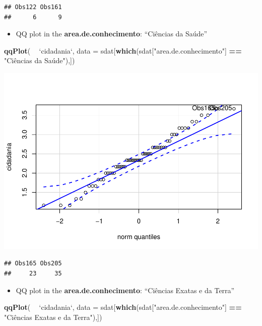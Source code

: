 \documentclass[]{article}
\newenvironment{Shaded}{\begin{snugshade}}{\end{snugshade}}
\newcommand{\DataTypeTok}[1]{\textcolor[rgb]{0.13,0.29,0.53}{#1}}
\newcommand{\KeywordTok}[1]{\textcolor[rgb]{0.13,0.29,0.53}{\textbf{#1}}}
\newcommand{\NormalTok}[1]{#1}
\newcommand{\OperatorTok}[1]{\textcolor[rgb]{0.81,0.36,0.00}{\textbf{#1}}}
\newcommand{\StringTok}[1]{\textcolor[rgb]{0.31,0.60,0.02}{#1}}
\providecommand{\tightlist}{%
  \setlength{\itemsep}{0pt}\setlength{\parskip}{0pt}}
\begin{document}
\begin{verbatim}
## Obs122 Obs161 
##      6      9
\end{verbatim}

\begin{itemize}
\tightlist
\item
  QQ plot in the \textbf{area.de.conhecimento}: ``Ciências da Saúde''
\end{itemize}

\begin{Shaded}
\begin{Highlighting}[]
\KeywordTok{qqPlot}\NormalTok{( }\OperatorTok{~}\StringTok{ `}\DataTypeTok{cidadania}\StringTok{`}\NormalTok{, }\DataTypeTok{data =}\NormalTok{ sdat[}\KeywordTok{which}\NormalTok{(sdat[}\StringTok{"area.de.conhecimento"}\NormalTok{] }\OperatorTok{==}\StringTok{ "Ciências da Saúde"),])}
\end{Highlighting}
\end{Shaded}

\includegraphics{factorialAnova_files/figure-latex/unnamed-chunk-24-1.pdf}

\begin{verbatim}
## Obs165 Obs205 
##     23     35
\end{verbatim}

\begin{itemize}
\tightlist
\item
  QQ plot in the \textbf{area.de.conhecimento}: ``Ciências Exatas e da
  Terra''
\end{itemize}

\begin{Shaded}
\begin{Highlighting}[]
\KeywordTok{qqPlot}\NormalTok{( }\OperatorTok{~}\StringTok{ `}\DataTypeTok{cidadania}\StringTok{`}\NormalTok{, }\DataTypeTok{data =}\NormalTok{ sdat[}\KeywordTok{which}\NormalTok{(sdat[}\StringTok{"area.de.conhecimento"}\NormalTok{] }\OperatorTok{==}\StringTok{ "Ciências Exatas e da Terra"}\NormalTok{),])}
\end{Highlighting}
\end{Shaded}
\end{document}
